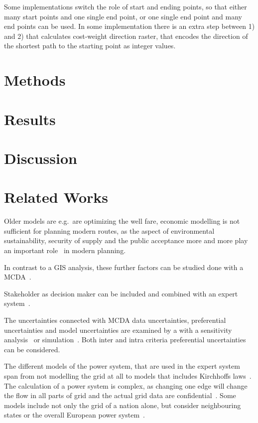 \documentclass[acmtog]{acmart}
\begin{document}
	Some implementations switch the role of start and ending points, so that either many start points and one single end point, or one single end point and many end points can be used.
	In some implementation there is an extra step between 1) and 2) that calculates cost-weight direction raster, that encodes the direction of the shortest
	path to the starting point as integer values.

	\section{Methods}\label{sec:methods}
	

	\section{Results}\label{sec:results}
	
	
	\section{Discussion}\label{sec:discussion}
	

	\section{Related Works}\label{sec:related-works}

	
	
	Older models are e.g.\ are optimizing the well fare, economic modelling is not sufficient for planning modern routes, as the aspect of environmental sustainability, security of supply and the public acceptance more and more play an important role~\cite{hauff_gesellschaftliche_2011} in modern planning.
	
	In contrast to a GIS analysis, these further factors can be studied done with a \acrfull{MCDA}~\cite{bertsch_participatory_2016}.

	Stakeholder as decision maker can be included and combined with an expert system~\cite{bertsch_participatory_2016}.
	
	The uncertainties connected with \acrshort{MCDA} data uncertainties, preferential uncertainties and model uncertainties are examined by a with a sensitivity analysis~\cite{bertsch_participatory_2016} or simulation~\cite{butler_simulation_1997}.
	Both inter and intra criteria preferential uncertainties~\cite{bertsch_sensitivity_2007} can be considered.
		
	The different models of the power system, that are used in the expert system span from not modelling the grid at all to models that includes Kirchhoffs laws~\cite{bertsch_participatory_2016}.
	The calculation of a power system is complex, as changing one edge will change the flow in all parts of grid and the actual grid data are confidential~\cite{bertsch_participatory_2016}.
	Some models include not only the grid of a nation alone, but consider neighbouring states or the overall European power system~\cite{dietrich_will_2010}.
\end{document}

